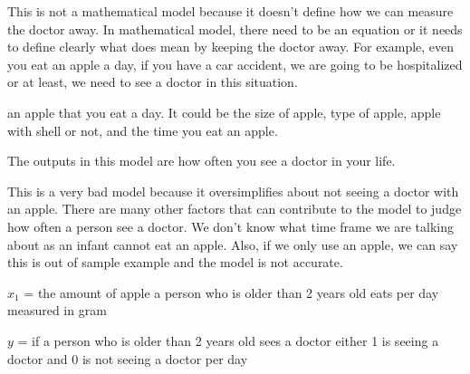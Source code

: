 \documentclass[12pt]{article}
\begin{document}

\begin{enumerate}



This is not a mathematical model because it doesn't define how we can measure the doctor away. In mathematical model, there need to be an equation or it needs to define clearly what does mean by keeping the doctor away. For example, even you eat an apple a day, if you have a car accident, we are going to be hospitalized or at least, we need to see a doctor in this situation. 


an apple that you eat a day. It could be the size of apple, type of apple, apple with shell or not, and the time you eat an apple. 


The outputs in this model are how often you see a doctor in your life.\textbf{}


This is a very bad model because it oversimplifies about not seeing a doctor with an apple. There are many other factors that can contribute to the model to judge how often a person see a doctor. We don't know what time frame we are talking about as an infant cannot eat an apple. Also, if we only use an apple, we can say this is out of sample example and the model is not accurate. 


 $x_1$ = the amount of apple a person who is older than 2 years old eats per day measured in gram


$y$ = if a person who is older than 2 years old sees a doctor either 1 is seeing a doctor and 0 is not seeing a doctor per day 



\end{enumerate}
\end{document}
